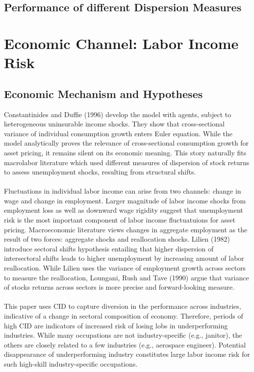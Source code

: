 \documentclass[12pt]{article}
\begin{document}
\subsection{Performance of different Dispersion Measures}


\section{Economic Channel: Labor Income Risk} \label{sec:Model}
\subsection{Economic Mechanism and Hypotheses}
Constantinides and Duffie (1996) develop the model with agents, subject to heterogeneous uninsurable income shocks. They show that cross-sectional variance of individual consumption growth enters Euler equation. While the model analytically proves the relevance of cross-sectional consumption growth for asset pricing, it remains silent on its economic meaning. This story naturally fits macrolabor literature which used different measures of dispersion of stock returns to assess unemployment shocks, resulting from structural shifts.
\paragraph{}
Fluctuations in individual labor income can arise from two channels: change in wage and change in employment. Larger magnitude of labor income shocks from employment loss as well as downward wage rigidity suggest that unemployment risk is the most important component of labor income fluctuatuions for asset pricing. Macroeconomic literature views changes in aggregate employment as the result of two forces: aggregate shocks and reallocation shocks. Lilien (1982) introduce sectoral shifts hypothesis entailing that higher dispersion of intersectoral shifts leads to higher unemployment by increasing amount of labor reallocation. While Lilien uses the variance of employment growth across sectors to measure the reallocation, Loungani, Rush and Tave (1990) argue that variance of stocks returns across sectors is more precise and forward-looking measure. 
\paragraph{}
This paper uses CID to capture diversion in the performance across industries, indicative of a change in sectoral composition of economy. Therefore, periods of high CID are indicators of increased risk of losing lobs in underperforming industries. While many occupations are not industry-specific (e.g., janitor), the others are closely related to a few industries (e.g., aerospace engineer). Potential disappearance of underperforming industry constitutes large labor income risk for such high-skill industry-specific occupations. 
\end{document}

